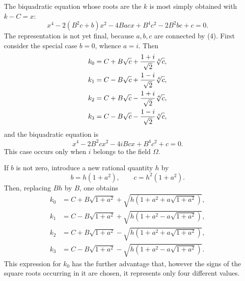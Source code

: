 \documentclass[11pt]{article}
\begin{document}
The biquadratic equation whose roots are the $k$ is most simply obtained with $k-C=x$:
\begin{equation}\tag{11}
  x^4-2(B^2c+b)x^2-4Bacx+B^4c^2-2B^2bc+c=0.
\end{equation}
The representation is not yet final, because $a,b,c$ are connected by (4). First consider the special case $b=0$, whence $a=i$. Then
\[
\begin{aligned}
 k_0&=C+B\sqrt c+{1+i\over\sqrt2}\sqrt[4]{c},\\
 k_1&=C-B\sqrt c+{1-i\over\sqrt2}\sqrt[4]{c},\\
 k_2&=C+B\sqrt c-{1+i\over\sqrt2}\sqrt[4]{c},\\
 k_3&=C-B\sqrt c-{1-i\over\sqrt2}\sqrt[4]{c},
\end{aligned}
\]
and the biquadratic equation is
\[
  x^4-2B^2cx^2-4iBcx+B^4c^2+c=0.
\]
This case occurs only when $i$ belongs to the field $\Omega$.

If $b$ is not zero, introduce a new rational quantity $h$ by
\[
  b=h(1+a^2),\qquad c=h^2(1+a^2).
\]
Then, replacing $Bh$ by $B$, one obtains
\begin{equation}\tag{12}
\begin{aligned}
 k_0&=C+B\sqrt{1+a^2}+\sqrt{h(1+a^2+a\sqrt{1+a^2})},\\
 k_1&=C-B\sqrt{1+a^2}+\sqrt{h(1+a^2-a\sqrt{1+a^2})},\\
 k_2&=C+B\sqrt{1+a^2}-\sqrt{h(1+a^2+a\sqrt{1+a^2})},\\
 k_3&=C-B\sqrt{1+a^2}-\sqrt{h(1+a^2-a\sqrt{1+a^2})}.
\end{aligned}
\end{equation}
This expression for $k_0$ has the further advantage that, however the signs of the square roots occurring in it are chosen, it represents only four different values.
\end{document}
